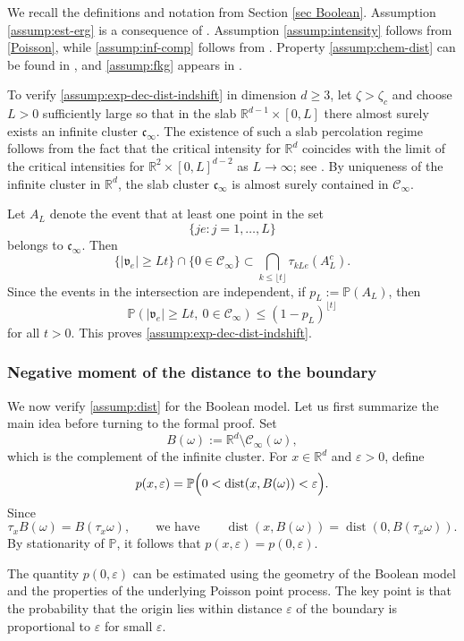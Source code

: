 \documentclass[11pt]{article}
\newcommand{\dist}{\mathop{\mathrm{dist}}}
\newcommand{\R}{\mathbb R}
\newcommand{\eps}{\varepsilon}
\renewcommand{\P}{\mathbb P}
\theoremstyle{rem}
\begin{document}
We recall the definitions and notation from Section \ref{sec Boolean}. Assumption \ref{assump:est-erg} is a consequence of \cite[Propositions 2.6--2.7]{MR96}. Assumption \ref{assump:intensity} follows from \eqref{Poisson}, while \ref{assump:inf-comp} follows from \cite[Theorems 3.5--3.6]{MR96}. Property \ref{assump:chem-dist} can be found in \cite[Lemma 3.4]{CGY11}, and \ref{assump:fkg} appears in \cite[Theorem 2.2]{MR96}.

To verify \ref{assump:exp-dec-dist-indshift} in dimension $d\geq3$, let $\zeta>\zeta_c$ and choose $L>0$ sufficiently large so that in the slab
$\R^{d-1}\times[0,L]$
there almost surely exists an infinite cluster $\mathfrak c_\infty$. The existence of such a slab percolation regime follows from the fact that the critical intensity for $\R^d$ coincides with the limit of the critical intensities for
$\R^2\times[0,L]^{d-2}$
as $L\to\infty$; see \cite[Theorem 1]{T93}. By uniqueness of the infinite cluster in $\R^d$, the slab cluster $\mathfrak c_\infty$ is almost surely contained in ${\mathcal C_\infty}$.

Let $A_L$ denote the event that at least one point in the set
\[
\{je:j=1,\dots,L\}
\]
belongs to $\mathfrak c_\infty$. Then
\[
\{|\mathfrak v_e|\geq Lt\}\cap\{0\in{\mathcal C_\infty}\}
\subset
\bigcap_{k\leq \lfloor t\rfloor}\tau_{kLe}(A_L^c).
\]
Since the events in the intersection are independent, if
$p_L:=\P(A_L)$, then
\[
\P(|\mathfrak v_e|\geq Lt,\ 0\in{\mathcal C_\infty})
\leq
(1-p_L)^{\lfloor t\rfloor}
\]
for all $t>0$. This proves \ref{assump:exp-dec-dist-indshift}.

\subsubsection{Negative moment of the distance to the boundary}\label{subsec proof P6}

We now verify \ref{assump:dist} for the Boolean model. Let us first summarize the main idea before turning to the formal proof. Set
\[
B(\omega):=\R^d\setminus \mathcal C_\infty(\omega),
\]
which is the complement of the infinite cluster. For $x\in\R^d$ and $\eps>0$, define
\[
p(x,\eps)
=
\P\Bigl(
0<\dist(x,B(\omega))<\eps
\Bigr).
\]
Since
\[
\tau_x B(\omega)=B(\tau_x\omega),
\qquad\mbox{we have}\qquad 
\dist(x,B(\omega))
=
\dist(0,B(\tau_x\omega)).
\]
By stationarity of $\P$, it follows that
$p(x,\eps)=p(0,\eps)$.


The quantity $p(0,\eps)$ can be estimated using the geometry of the Boolean model and the properties of the underlying Poisson point process. The key point is that the probability that the origin lies within distance $\eps$ of the boundary is proportional to $\eps$ for small $\eps$.
\end{document}

